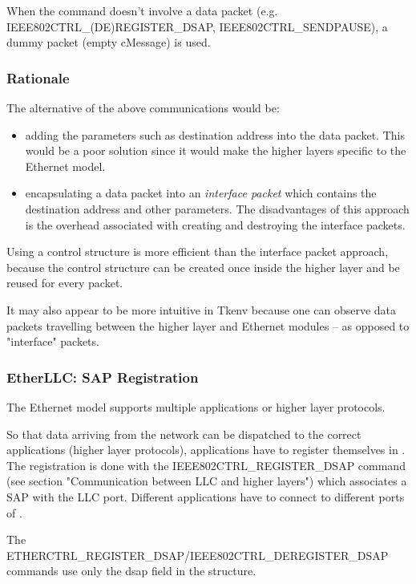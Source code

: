 When the command doesn't involve a data packet (e.g.
IEEE802CTRL\_(DE)REGISTER\_DSAP, IEEE802CTRL\_SENDPAUSE), a dummy packet
(empty cMessage) is used.

\subsubsection{Rationale}

The alternative of the above communications would be:

\begin{itemize}
  \item adding the parameters such as destination address into the data
    packet. This would be a poor solution since it would make the
    higher layers specific to the Ethernet model.
  \item encapsulating a data packet into an \textit{interface packet} which
    contains the destination address and other parameters. The
    disadvantages of this approach is the overhead associated with
    creating and destroying the interface packets.
\end{itemize}

Using a control structure is more efficient than the interface packet
approach, because the control structure can be created once inside
the higher layer and be reused for every packet.

It may also appear to be more intuitive in Tkenv because one can observe
data packets travelling between the higher layer and Ethernet
modules -- as opposed to "interface" packets.


\subsubsection{EtherLLC: SAP Registration}

The Ethernet model supports multiple applications or higher layer
protocols.

So that data arriving from the network can be dispatched to the
correct applications (higher layer protocols), applications
have to register themselves in . The registration
is done with the IEEE802CTRL\_REGISTER\_DSAP command
(see section "Communication between LLC and higher layers")
which associates a SAP with the LLC port. Different applications
have to connect to different ports of .

The ETHERCTRL\_REGISTER\_DSAP/IEEE802CTRL\_DEREGISTER\_DSAP commands use only the
dsap field in the  structure.

